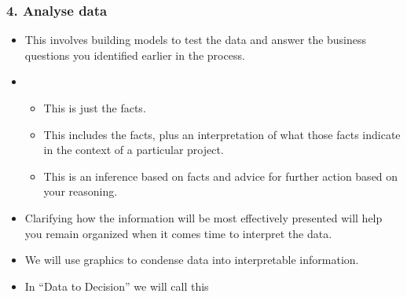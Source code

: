 \documentclass[letterpaper,10pt,english]{jupyterBook}
\begin{document}
\subsubsection{4. Analyse data}
\label{\detokenize{1_Decision_making/Decision_making:analyse-data}}\begin{itemize}
\item {} 
\sphinxAtStartPar
{} This involves building models to test the data and answer the business questions you identified earlier in the process.

\item {} 
\sphinxAtStartPar
{}
\begin{itemize}
\item {} 
\sphinxAtStartPar
{} This is just the facts.

\item {} 
\sphinxAtStartPar
{} This includes the facts, plus an interpretation of what those facts indicate in the context of a particular project.

\item {} 
\sphinxAtStartPar
{} This is an inference based on facts and advice for further action based on your reasoning.

\end{itemize}

\item {} 
\sphinxAtStartPar
Clarifying how the information will be most effectively presented will help you remain organized when it comes time to interpret the data.

\item {} 
\sphinxAtStartPar
We will use graphics to condense data into interpretable information.

\item {} 
\sphinxAtStartPar
In “Data to Decision” we will call this 

\end{itemize}
\end{document}
